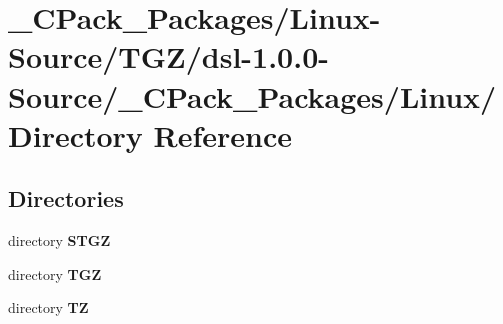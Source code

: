 \section{\_\-CPack\_\-Packages/Linux-\/Source/TGZ/dsl-\/1.0.0-\/Source/\_\-CPack\_\-Packages/Linux/ Directory Reference}
\label{dir_42b7a0636cc444bb7e42c333d21ce17c}
\subsection*{Directories}
\begin{DoxyCompactItemize}
\item 
directory {\bf STGZ}
\item 
directory {\bf TGZ}
\item 
directory {\bf TZ}
\end{DoxyCompactItemize}
